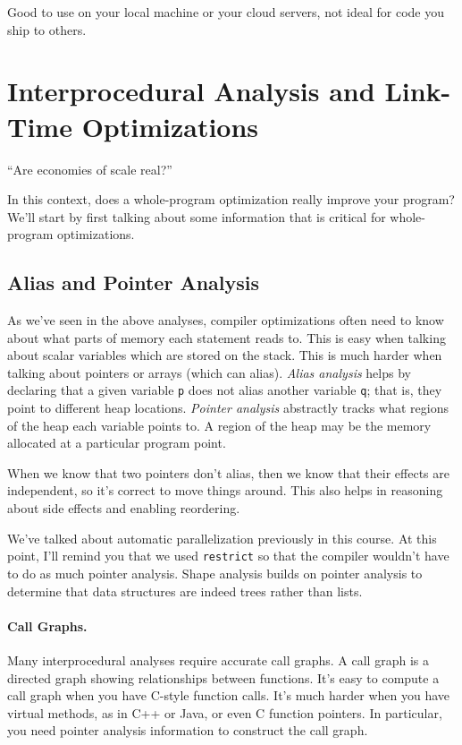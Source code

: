 \documentclass[a4paper]{report}
\begin{document}
\noindent
Good to use on your local machine or your cloud servers, not ideal for code you ship to others.


\section*{Interprocedural Analysis and Link-Time Optimizations}
\hfill ``Are economies of scale real?''

In this context, does a
whole-program optimization really improve your program?
We'll start by first talking about some information that is critical for
whole-program optimizations.

\subsection*{Alias and Pointer Analysis}
As we've seen in the above analyses, compiler optimizations often need
to know about what parts of memory each statement reads to.  This is
easy when talking about scalar variables which are stored on the
stack. This is much harder when talking about pointers or arrays
(which can alias). \emph{Alias analysis} helps by declaring that a
given variable {\tt p} does not alias another variable {\tt q}; that
is, they point to different heap locations. \emph{Pointer analysis}
abstractly tracks what regions of the heap each variable points to.
A region of the heap may be the memory allocated at a particular
program point.

When we know that two pointers don't alias, then we know that their
effects are independent, so it's correct to move things around.
This also helps in reasoning about side effects and enabling reordering.

We've talked about automatic parallelization previously in this course.
At this point, I'll remind you that we used {\tt restrict} so that the
compiler wouldn't have to do as much pointer analysis. Shape analysis
builds on pointer analysis to determine that data structures are indeed
trees rather than lists.

\paragraph{Call Graphs.} Many interprocedural analyses require accurate
call graphs. A call graph is a directed graph showing relationships between
functions. It's easy to compute a call graph when you have C-style
function calls. It's much harder when you have virtual methods, as in
C++ or Java, or even C function pointers. In particular, you need pointer
analysis information to construct the call graph.
\end{document}

